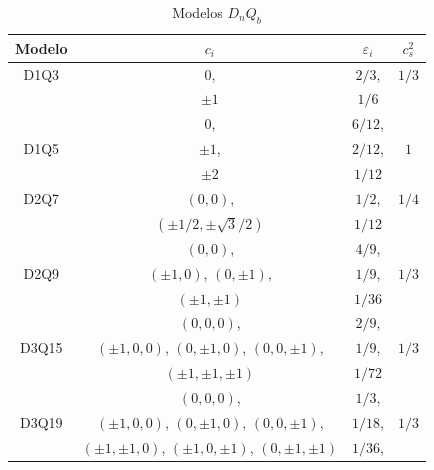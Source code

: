 \begin{table}[ht!]
\centering
\caption{Modelos $D_{n}Q_{b}$}
\label{table:modelos}
\begin{tabular}{|c|c|c|c|}
\hline
Modelo & $c_{i}$ & $\varepsilon_{i}$ & $c_{s}^{2}$ \\ \hline
D1Q3   & $0$,                        & $2/3$,                   & $1/3$ \\
   	   & $\pm 1$                     & $1/6$                    &     \\ \hline
   	   & $0$,                        & $6/12$,				    &  \\
D1Q5   & $\pm 1$,                    & $2/12$,			        & $1$ \\  
       & $\pm 2$                     & $1/12$			        &    \\ \hline
D2Q7   & $(0,0)$,                  & $1/2$,                    & $1/4$ \\ 
	   & $(\pm 1/2, \pm \sqrt{3}/2)$ & $1/12$                  &    \\ \hline
       & $(0,0)$,                     & $4/9$,                    &    \\
D2Q9   & $(\pm 1,0)$, $(0,\pm 1)$,    & $1/9$,                    & $1/3$   \\
   	   & $(\pm 1,\pm 1)$              & $1/36$                    &    \\ \hline
	   & $(0,0,0)$,                           & $2/9$,            &   \\ 
D3Q15  & $(\pm 1,0,0)$, $(0,\pm 1,0)$, $(0,0,\pm 1)$, & $1/9$,   & $1/3$ \\ 
	   & $(\pm 1, \pm 1,\pm 1)$               & $1/72$           &   \\ \hline
	   & $(0,0,0)$,                           & $1/3$,                        &    \\ 
D3Q19  & $(\pm 1,0,0)$, $(0,\pm 1,0)$, $(0,0,\pm 1)$, & $1/18$,               & $1/3$ \\ 
	   & $(\pm 1,\pm 1,0)$, $(\pm 1,0,\pm 1)$, $(0,\pm 1,\pm 1)$ & $1/36$,    &    \\ \hline 
\end{tabular}
\end{table}

